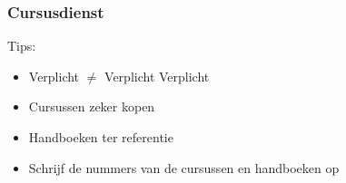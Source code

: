 \begin{frame}[allowframebreaks=10]
	\frametitle{Cursusdienst}
    \vspace{0.5cm}
    
    Tips:
    \begin{itemize}
        \item Verplicht $\neq$ Verplicht Verplicht
        \item Cursussen zeker kopen
        \item Handboeken ter referentie
        \item Schrijf de nummers van de cursussen en handboeken op
	\end{itemize}
    


\end{frame}
